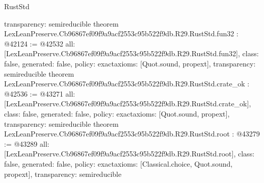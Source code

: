 \begin{lexlean}{RustStd}
\begin{coremodule}
{  transparency: semireducible
}
theorem LexLeanPreserve.Cb96867ef09f9a9acf2553c95b522f9db.R29.RustStd.fun32 : @42124 := @42532 {
  all: [LexLeanPreserve.Cb96867ef09f9a9acf2553c95b522f9db.R29.RustStd.fun32],
  class: false,
  generated: false,
  policy: exact{axioms: [Quot.sound, propext]},
  transparency: semireducible
}
theorem LexLeanPreserve.Cb96867ef09f9a9acf2553c95b522f9db.R29.RustStd.crate_ok : @42536 := @43271 {
  all: [LexLeanPreserve.Cb96867ef09f9a9acf2553c95b522f9db.R29.RustStd.crate_ok],
  class: false,
  generated: false,
  policy: exact{axioms: [Quot.sound, propext]},
  transparency: semireducible
}
theorem LexLeanPreserve.Cb96867ef09f9a9acf2553c95b522f9db.R29.RustStd.root : @43279 := @43289 {
  all: [LexLeanPreserve.Cb96867ef09f9a9acf2553c95b522f9db.R29.RustStd.root],
  class: false,
  generated: false,
  policy: exact{axioms: [Classical.choice, Quot.sound, propext]},
  transparency: semireducible
}


\end{coremodule}
\end{lexlean}
